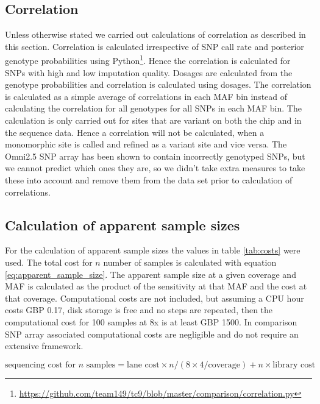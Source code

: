 \subsection{Correlation}
Unless otherwise stated we carried out calculations of correlation as described in this section. Correlation is calculated irrespective of SNP call rate and posterior genotype probabilities using Python\footnote{\url{https://github.com/team149/tc9/blob/master/comparison/correlation.py}}. Hence the correlation is calculated for \glspl{SNP} with high and low imputation quality. Dosages are calculated from the genotype probabilities and correlation is calculated using dosages. The correlation is calculated as a simple average of correlations in each \gls{MAF} bin instead of calculating the correlation for all genotypes for all \glspl{SNP} in each \gls{MAF} bin. The calculation is only carried out for sites that are variant on both the chip and in the sequence data. Hence a correlation will not be calculated, when a monomorphic site is called and refined as a variant site and vice versa. The Omni2.5 \gls{SNP} array has been shown to contain incorrectly genotyped SNPs\cite{Gurdasani2015}, but we cannot predict which ones they are, so we didn't take extra measures to take these into account and remove them from the data set prior to calculation of correlations.

\subsection{Calculation of apparent sample sizes}
\label{subsec:samplesize}
For the calculation of apparent sample sizes the values in table \ref{tab:costs} were used. The total cost  for $n$ number of samples is calculated with equation \ref{eq:apparent_sample_size}. The apparent sample size at a given coverage and \gls{MAF} is calculated as the product of the sensitivity at that \gls{MAF} and the cost at that coverage. Computational costs are not included, but assuming a \gls{CPU} hour costs \gls{GBP} 0.17, disk storage is free and no steps are repeated, then the computational cost for 100 samples at 8x is at least \gls{GBP} 1500. In comparison \gls{SNP} array associated computational costs are negligible and do not require an extensive framework.


\begin{equation}
\text{sequencing cost for } n \text{ samples} = \text{lane cost} \times n/(8 \times 4 / \text{coverage}) + n \times \text{library cost}
\label{eq:apparent_sample_size}
\end{equation}